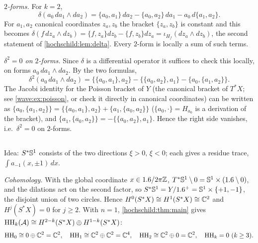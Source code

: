 \emph{$2$-forms.} For $k=2$,
\begin{equation*}
  \delta(a_0\,da_1\wedge da_2)=\{a_0,a_1\}\,da_2-\{a_0,a_2\}\,da_1-a_0\,d\{a_1,a_2\}.
\end{equation*}
For $a_1,a_2$ canonical coordinates $z_a,z_b$ the bracket $\{z_a,z_b\}$ is constant and this becomes
$\delta(f\,dz_a\wedge dz_b)=\{f,z_a\}dz_b-\{f,z_b\}dz_a=\iota_{H_f}(dz_a\wedge dz_b)$, the second statement of
\cref{hochschild:lem:delta}. Every $2$-form is locally a sum of such terms.

\emph{$\delta^2=0$ on $2$-forms.} Since $\delta$ is a differential operator it suffices to check this locally,
on forms $a_0\,da_1\wedge da_2$. By the two formulas,
\begin{equation*}
  \delta^2(a_0\,da_1\wedge da_2)=\{\{a_0,a_1\},a_2\}-\{\{a_0,a_2\},a_1\}-\{a_0,\{a_1,a_2\}\}.
\end{equation*}
The Jacobi identity for the Poisson bracket of $Y$ (the canonical bracket of $T^*X$; see
\cref{wave:ex:poisson}, or check it directly in canonical coordinates) can be written as
$\{a_0,\{a_1,a_2\}\}=\{\{a_0,a_1\},a_2\}+\{a_1,\{a_0,a_2\}\}$ ($\{a_0,\cdot\}=H_{a_0}$ is a derivation of the
bracket), and $\{a_1,\{a_0,a_2\}\}=-\{\{a_0,a_2\},a_1\}$. Hence the right side vanishes, i.e.\ $\delta^2=0$ on
$2$-forms.

\subsection*{}
Idea: $S^*\mathbb{S}^1$ consists of the two directions $\xi>0$, $\xi<0$; each gives a residue trace,
$\int a_{-1}(x,\pm1)\,dx$.

\emph{Cohomology.} With the global coordinate $x\in1.6/2\pi\mathbb{Z}$, $T^*\mathbb{S}^1\setminus0=\mathbb{S}^1\times(1.6\setminus0)$, and
the dilations act on the second factor, so $S^*\mathbb{S}^1=Y/1.6^+=\mathbb{S}^1\times\{+1,-1\}$, the disjoint union of two
circles. Hence $H^0(S^*X)\cong H^1(S^*X)\cong\mathbb{C}^2$ and $H^j(S^*X)=0$ for $j\ge2$. With $n=1$,
\cref{hochschild:thm:main} gives $\operatorname{HH}_k(\mathcal{A})\cong H^{2-k}(S^*X)\oplus H^{1-k}(S^*X)$:
\begin{equation*}
  \operatorname{HH}_0\cong0\oplus\mathbb{C}^2=\mathbb{C}^2,\quad\operatorname{HH}_1\cong\mathbb{C}^2\oplus\mathbb{C}^2=\mathbb{C}^4,\quad\operatorname{HH}_2\cong\mathbb{C}^2\oplus0=\mathbb{C}^2,\quad
  \operatorname{HH}_k=0\ (k\ge3).
\end{equation*}

